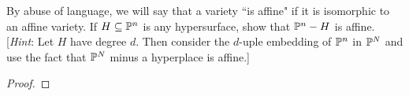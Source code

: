\label{1.3.5}

By abuse of language, we will say that a variety ``is affine" if it is isomorphic to an affine variety. If $H \subseteq \P^n$ is any hypersurface, show that $\P^n - H$ is affine. [\emph{Hint}: Let $H$ have degree $d$. Then consider the $d$-uple embedding of $\P^n$ in $\P^N$ and use the fact that $\P^N$ minus a hyperplace is affine.]

\begin{proof}

\end{proof}
